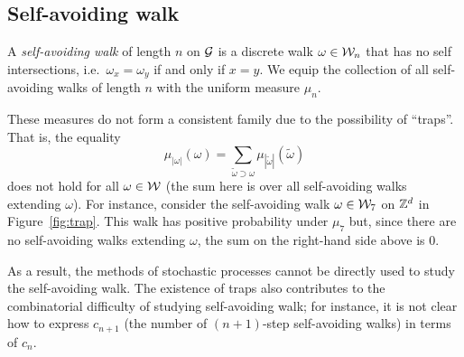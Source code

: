 
\subsection{Self-avoiding walk}

A \emph{self-avoiding walk} of length $n$ on $\mathcal{G}$ is a discrete walk $\omega\in\mathcal{W}_n$
that has no self intersections, i.e.\ $\omega_x = \omega_y$ if and only if $x = y$.
We equip the collection of all self-avoiding walks of length $n$ with the uniform measure $\mu_n$.

These measures do not form a consistent family due to the possibility of ``traps''.
That is, the equality
\begin{equation}
\mu_{|\omega|}(\omega) = \sum_{\tilde\omega \supset \omega} \mu_{|\tilde\omega|}(\tilde\omega)
\end{equation}
does not hold for all $\omega\in\mathcal{W}$ (the sum here is over all self-avoiding walks extending
$\omega$).
For instance, consider the self-avoiding walk $\omega\in\mathcal{W}_7$ on ${ {{\mathbb Z}}^d }$ in
Figure~\ref{fig:trap}.
This walk has positive probability under $\mu_7$ but,
since there are no self-avoiding walks extending $\omega$, the sum on the right-hand side
above is $0$.

As a result, the methods of stochastic processes cannot be directly used to study the self-avoiding
walk. The existence of traps also contributes to the combinatorial difficulty of studying
self-avoiding walk; for instance, it is not clear how to express $c_{n+1}$ (the number of
$(n+1)$-step self-avoiding walks) in terms of $c_n$.



